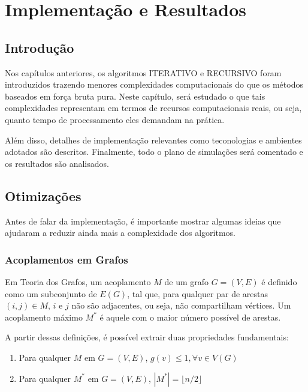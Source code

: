 \chapter{Implementação e Resultados}
\label{cap:resultados}

\section{Introdução}

Nos capítulos anteriores, os algoritmos ITERATIVO e RECURSIVO foram introduzidos trazendo menores complexidades computacionais do que os métodos baseados em força bruta pura. Neste capítulo, será estudado o que tais complexidades representam em termos de recursos computacionais reais, ou seja, quanto tempo de processamento eles demandam na prática. 

Além disso, detalhes de implementação relevantes como teconologias e ambientes adotados são descritos. Finalmente, todo o plano de simulações será comentado e os resultados são analisados.

\section{Otimizações}

Antes de falar da implementação, é importante mostrar algumas ideias que ajudaram a reduzir ainda mais a complexidade dos algoritmos.

\subsection{Acoplamentos em Grafos}

Em Teoria dos Grafos, um acoplamento $M$ de um grafo $G=(V,E)$ é definido como um subconjunto de $E(G)$, tal que, para qualquer par de arestas $(i,j) \in M$, $i$ e $j$ não são adjacentes, ou seja, não compartilham vértices. Um acoplamento máximo $M^*$ é aquele com o maior número possível de arestas. 

A partir dessas definições, é possível extrair duas propriedades fundamentais:
\begin{enumerate}
\item Para qualquer $M$ em $G=(V,E)$, $g(v) \leq 1, \forall v \in V(G)$
\item Para qualquer $M^*$ em $G=(V,E)$, $|M^*|= \lfloor n/2 \rfloor$
\end{enumerate}

